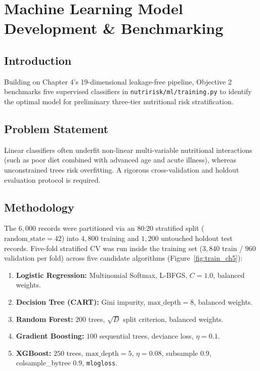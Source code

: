 \documentclass[12pt,a4paper]{report}
\begin{document}
\chapter{Machine Learning Model Development \& Benchmarking}

\section{Introduction}
Building on Chapter 4's 19-dimensional leakage-free pipeline, Objective 2 benchmarks five supervised classifiers in \texttt{nutririsk/ml/training.py} to identify the optimal model for preliminary three-tier nutritional risk stratification.

\section{Problem Statement}
Linear classifiers often underfit non-linear multi-variable nutritional interactions (such as poor diet combined with advanced age and acute illness), whereas unconstrained trees risk overfitting. A rigorous cross-validation and holdout evaluation protocol is required.

\section{Methodology}
The $6{,}000$ records were partitioned via an 80:20 stratified split ($\text{random\_state} = 42$) into $4{,}800$ training and $1{,}200$ untouched holdout test records. Five-fold stratified CV was run inside the training set ($3{,}840$ train / $960$ validation per fold) across five candidate algorithms (Figure~\ref{fig:train_ch5}):
\begin{enumerate}
    \item \textbf{Logistic Regression:} Multinomial Softmax, L-BFGS, $C=1.0$, balanced weights.
    \item \textbf{Decision Tree (CART):} Gini impurity, $\text{max\_depth}=8$, balanced weights.
    \item \textbf{Random Forest:} $200$ trees, $\sqrt{D}$ split criterion, balanced weights.
    \item \textbf{Gradient Boosting:} $100$ sequential trees, deviance loss, $\eta = 0.1$.
    \item \textbf{XGBoost:} $250$ trees, $\text{max\_depth}=5$, $\eta=0.08$, subsample $0.9$, colsample\_bytree $0.9$, \texttt{mlogloss}.
\end{enumerate}
\end{document}
